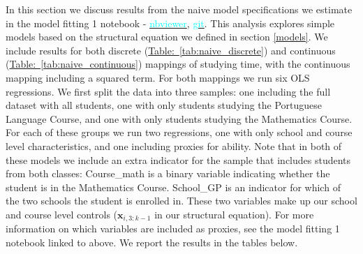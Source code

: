 \documentclass[12pt]{article}
\begin{document}
In this section we discuss results from the naive model specifications we estimate in the model fitting 1 notebook -  \href{https://nbviewer.jupyter.org/github/nadavtadelis/Reproducible_Metrics/blob/master/model_fitting_1.ipynb}{\textcolor{cyan}{nbviewer}}, \href{https://github.com/nadavtadelis/Reproducible_Metrics/blob/master/model_fitting_1.ipynb}{\textcolor{cyan}{git}}. This analysis explores simple models based on the structural equation we defined in section \ref{models}. We include results for both discrete (\hyperref[tab:naive_discrete]{Table:~\ref*{tab:naive_discrete}}) and continuous (\hyperref[tab:naive_continuous]{Table:~\ref*{tab:naive_continuous}}) mappings of studying time, with the continuous mapping including a squared term. For both mappings we run six OLS regressions. We first split the data into three samples: one including the full dataset with all students, one with only students studying the Portuguese Language Course, and one with only students studying the Mathematics Course. For each of these groups we run two regressions, one with only school and course level characteristics, and one including proxies for ability. Note that in both of these models we include an extra indicator for the sample that includes students from both classes: Course\_math is a binary variable indicating whether the student is in the Mathematics Course. School\_GP is an indicator for which of the two schools the student is enrolled in. These two variables make up our school and course level controls ($\bm{x}_{i,3:k-1}$ in our structural equation). For more information on which variables are included as proxies, see the model fitting 1 notebook linked to above. We report the results in the tables below.
\end{document}
